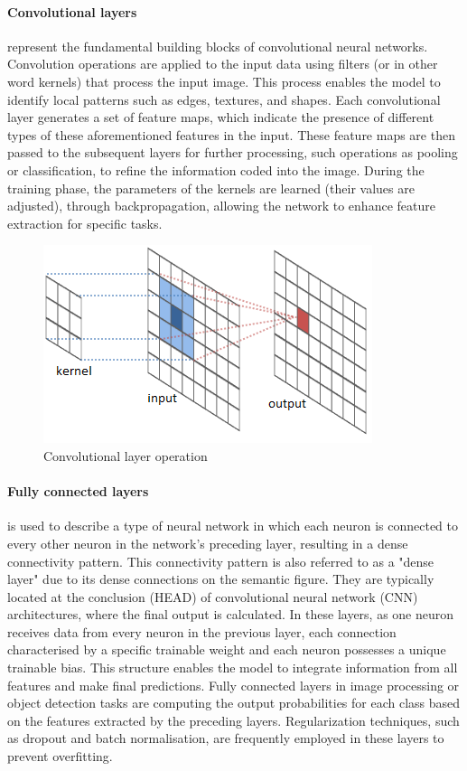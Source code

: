 \paragraph{Convolutional layers}\label{par:convolutional-layers}
represent the fundamental building blocks of convolutional neural networks.
Convolution operations are applied to the input data using filters (or in other word kernels) that process the input image.
This process enables the model to identify local patterns such as  edges, textures, and shapes.
Each convolutional layer generates a set of feature maps,
which indicate the presence of different types of these aforementioned features in the input.
These feature maps are then passed to the subsequent layers for further processing, such operations as pooling or classification,
to refine the information coded into the image.
During the training phase, the parameters of the kernels are learned (their values are adjusted), through backpropagation,
allowing the network to enhance feature extraction for specific tasks.


\begin{figure}[ht]
\centering
\includegraphics[width=.50\textwidth]{figures/convolution}
\caption{Convolutional layer operation~\cite{article}}
\label{fig:convolution}
\end{figure}

\paragraph{Fully connected layers}\label{par:fully-connected-layers}

is used to describe a type of neural network in which each
neuron is connected to every other neuron in the network's preceding layer, resulting in a dense connectivity pattern.
This connectivity pattern is also referred to as a "dense layer" due to its dense connections on the semantic figure.
They are typically located at the conclusion (HEAD) of convolutional neural network (CNN) architectures, where the final output is calculated.
In these layers, as one neuron receives data from every neuron in the previous layer, each connection characterised by a specific trainable weight and each neuron possesses a unique trainable bias.
This structure enables the model to integrate information from all features and make final predictions.
Fully connected layers in image processing or object detection tasks are computing the output probabilities for each class based on the features extracted by the preceding layers.
Regularization techniques, such as dropout and batch normalisation, are frequently employed in these layers to prevent overfitting.

